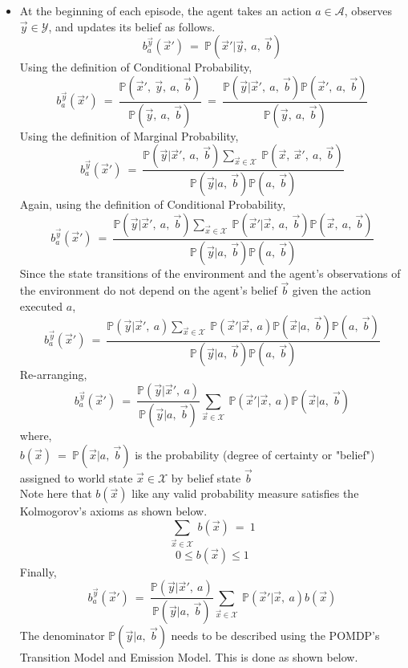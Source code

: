 \documentclass[12pt, draftcls, onecolumn]{IEEEtran}
\begin{document}
\begin{itemize}
    \item At the beginning of each episode, the agent takes an action $a \in \mathcal{A}$, observes $\vec{y} \in \mathcal{Y}$, and updates its belief as follows.
    \[b_a^{\vec{y}}(\vec{x}')\ =\ \mathbb{P}(\vec{x}'|\vec{y},\ a,\ \vec{b})\]
    Using the definition of Conditional Probability,
    \[b_a^{\vec{y}}(\vec{x}')\ =\ \frac{\mathbb{P}(\vec{x}',\ \vec{y},\ a,\ \vec{b})}{\mathbb{P}(\vec{y},\ a,\ \vec{b})}\ =\ \frac{\mathbb{P}(\vec{y}|\vec{x}',\ a,\ \vec{b})\mathbb{P}(\vec{x}',\ a,\ \vec{b})}{\mathbb{P}(\vec{y},\ a,\ \vec{b})}\]
    Using the definition of Marginal Probability,
    \[b_a^{\vec{y}}(\vec{x}')\ =\ \frac{\mathbb{P}(\vec{y}|\vec{x}',\ a,\ \vec{b})\sum_{\vec{x} \in \mathcal{X}}\ \mathbb{P}(\vec{x},\ \vec{x}',\ a,\ \vec{b})}{\mathbb{P}(\vec{y}|a,\ \vec{b})\mathbb{P}(a,\ \vec{b})}\]
    Again, using the definition of Conditional Probability,
    \[b_a^{\vec{y}}(\vec{x}')\ =\ \frac{\mathbb{P}(\vec{y}|\vec{x}',\ a,\ \vec{b})\sum_{\vec{x} \in \mathcal{X}}\ \mathbb{P}(\vec{x}'|\vec{x},\ a,\ \vec{b})\mathbb{P}(\vec{x},\ a,\ \vec{b})}{\mathbb{P}(\vec{y}|a,\ \vec{b})\mathbb{P}(a,\ \vec{b})}\]
    Since the state transitions of the environment and the agent's observations of the environment do not depend on the agent's belief $\vec{b}$ given the action executed $a$,
    \[b_a^{\vec{y}}(\vec{x}')\ =\ \frac{\mathbb{P}(\vec{y}|\vec{x}',\ a)\sum_{\vec{x} \in \mathcal{X}}\ \mathbb{P}(\vec{x}'|\vec{x},\ a)\mathbb{P}(\vec{x}|a,\ \vec{b})\mathbb{P}(a,\ \vec{b})}{\mathbb{P}(\vec{y}|a,\ \vec{b})\mathbb{P}(a,\ \vec{b})}\]
    Re-arranging,
    \[b_a^{\vec{y}}(\vec{x}')\ =\ \frac{\mathbb{P}(\vec{y}|\vec{x}',\ a)}{\mathbb{P}(\vec{y}|a,\ \vec{b})}\sum_{\vec{x} \in \mathcal{X}}\ \mathbb{P}(\vec{x}'|\vec{x},\ a)\mathbb{P}(\vec{x}|a,\ \vec{b})\]
    where,
    \\$b(\vec{x})\ =\ \mathbb{P}(\vec{x}|a,\ \vec{b})$ is the probability (degree of certainty or "belief") assigned to world state $\vec{x} \in \mathcal{X}$ by belief state $\vec{b}$
    \\Note here that $b(\vec{x})$ like any valid probability measure satisfies the Kolmogorov's axioms as shown below.
    \[\sum_{\vec{x} \in \mathcal{X}}\ b(\vec{x})\ =\ 1\]
    \[0 \leq b(\vec{x}) \leq 1\]
    Finally,
    \[b_a^{\vec{y}}(\vec{x}')\ =\ \frac{\mathbb{P}(\vec{y}|\vec{x}',\ a)}{\mathbb{P}(\vec{y}|a,\ \vec{b})}\sum_{\vec{x} \in \mathcal{X}}\ \mathbb{P}(\vec{x}'|\vec{x},\ a)b(\vec{x})\]
    The denominator $\mathbb{P}(\vec{y}|a,\ \vec{b})$ needs to be described using the POMDP's Transition Model and Emission Model. This is done as shown below.

\end{itemize}
\end{document}
